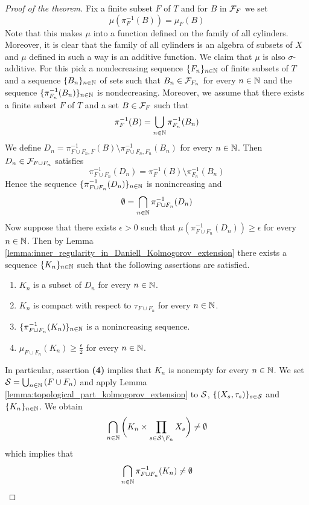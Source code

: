 \documentclass[10pt]{amsart}
\begin{document}
\begin{proof}[Proof of the theorem]
	Fix a finite subset $F$ of $T$ and for $B$ in ${\mathcal F}_F$ we set
	$$\mu\left(\pi^{-1}_F(B)\right) = \mu_F(B)$$
	Note that this makes $\mu$ into a function defined on the family of all cylinders. Moreover, it is clear that the family of all cylinders is an algebra of subsets of $X$ and $\mu$ defined in such a way is an additive function. We claim that $\mu$ is also $\sigma$-additive. For this pick a nondecreasing sequence $\{F_n\}_{n\in {\mathbb N}}$ of finite subsets of $T$ and a sequence $\{B_n\}_{n\in {\mathbb N}}$ of sets such that $B_n\in {\mathcal F}_{F_n}$ for every $n\in {\mathbb N}$ and the sequence $\{\pi_{F_n}^{-1}(B_n)\}_{n\in {\mathbb N}}$ is nondecreasing. Moreover, we assume that there exists a finite subset $F$ of $T$ and a set $B \in {\mathcal F}_{F}$ such that
	$$\pi_{F}^{-1}(B) = \bigcup_{n\in {\mathbb N}}\pi_{F_n}^{-1}(B_n)$$
	We define $D_n = \pi_{F\cup F_n,F}^{-1}(B)\setminus \pi_{F\cup F_n,F_n}^{-1}(B_n)$ for every $n\in {\mathbb N}$. Then $D_n \in {\mathcal F}_{F\cup F_n}$ satisfies
	$$\pi^{-1}_{F\cup F_n}(D_n) = \pi_F^{-1}(B)\setminus \pi^{-1}_{F_n}(B_n)$$
	Hence the sequence $\{\pi^{-1}_{F\cup F_n}(D_n)\}_{n\in {\mathbb N}}$ is nonincreasing and
	$$\emptyset = \bigcap_{n\in {\mathbb N}}\pi^{-1}_{F\cup F_n}(D_n)$$
	Now suppose that there exists $\epsilon > 0$ such that $\mu\left(\pi^{-1}_{F\cup F_n}(D_n)\right) \geq \epsilon$ for every $n\in {\mathbb N}$. Then by Lemma \ref{lemma:inner_regularity_in_Daniell_Kolmogorov_extension} there exists a sequence $\{K_n\}_{n\in {\mathbb N}}$ such that the following assertions are satisfied.
	\begin{enumerate}[label=\textbf{(\arabic*)}, leftmargin=*]
		\item $K_n$ is a subset of $D_n$ for every $n\in {\mathbb N}$.
		\item $K_n$ is compact with respect to $\tau_{F\cup F_n}$ for every $n\in {\mathbb N}$.
		\item $\{\pi^{-1}_{F\cup F_n}(K_n)\}_{n\in {\mathbb N}}$ is a nonincreasing sequence.
		\item $\mu_{F\cup F_n}(K_n) \geq \frac{\epsilon}{2}$ for every $n\in {\mathbb N}$.
	\end{enumerate}
	In particular, assertion \textbf{(4)} implies that $K_n$ is nonempty for every $n\in {\mathbb N}$. We set ${\mathcal S} = \bigcup_{n\in {\mathbb N}}\left(F\cup F_n\right)$ and apply Lemma \ref{lemma:topological_part_kolmogorov_extension} to ${\mathcal S}$, $\{(X_s,\tau_s)\}_{s\in {\mathcal S}}$ and $\{K_n\}_{n\in {\mathbb N}}$. We obtain
	$$\bigcap_{n\in {\mathbb N}}\bigg(K_n\times \prod_{s\in {\mathcal S}\setminus F_n}X_s\bigg) \neq \emptyset$$
	which implies that
	$$\bigcap_{n\in {\mathbb N}}\pi^{-1}_{F\cup F_n}(K_n) \neq \emptyset$$

\end{proof}
\end{document}
